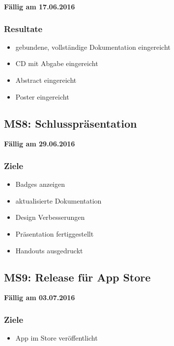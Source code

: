 \textbf{Fällig am 17.06.2016}

\subsubsection{Resultate}

\begin{itemize}
	\item gebundene, vollständige Dokumentation eingereicht
	\item CD mit Abgabe eingereicht
	\item Abstract eingereicht
	\item Poster eingereicht
\end{itemize}


\subsection{MS8: Schlusspräsentation}
\label{pm-ms8}

\textbf{Fällig am 29.06.2016}

\subsubsection{Ziele}

\begin{itemize}
	\item Badges anzeigen
	\item aktualisierte Dokumentation
	\item Design Verbesserungen
	\item Präsentation fertiggestellt
	\item Handouts ausgedruckt
\end{itemize}

\subsection{MS9: Release für App Store}
\label{pm-ms9}


\textbf{Fällig am 03.07.2016}

\subsubsection{Ziele}

\begin{itemize}
	\item {} App im  Store veröffentlicht
\end{itemize}
